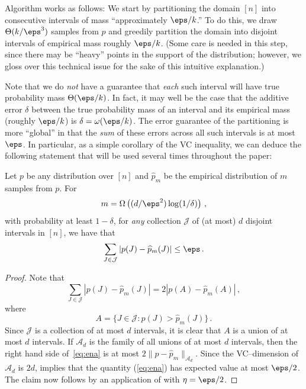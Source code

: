 %
%
Algorithm
\hyperref[alg:learn-kmodal-simple]{} works as follows: We start by partitioning
the domain $[n]$ into consecutive intervals of mass ``approximately $\eps/k$.''
To do this, {we draw $\Theta(k/\eps^3)$ samples from $p$ and greedily partition the domain  {into} disjoint intervals of 
empirical mass roughly $\eps/k$.} (Some care is needed in this step, since there may be ``heavy'' points in the support of the distribution;
however, we gloss over this technical issue for the sake of this intuitive explanation.)
{Note that we do \emph{not} have a guarantee that \emph{each} such interval will have true probability mass $\Theta(\eps/k)$. 
In fact, it may well be the case that the additive error $\delta$ between the true probability mass of an interval and its empirical mass
(roughly $\eps/k$) is $\delta = \omega(\eps/k)$.
The error guarantee of the partitioning is more ``global''  in that the \emph{sum} of these errors across all such intervals 
is at most $\eps$. In particular,  as a simple corollary of the VC inequality, we can deduce 
the following statement that will be used several times throughout the paper:

\begin{fact} \label{fact:vc}
Let $p$ be any distribution over $[n]$ and $\widehat{p}_m$ be the empirical distribution of $m$ samples from $p$.  
For 
\[
m = \Omega\left( (d/\eps^2) \log(1/\delta) \right)\,,
\]
with probability at least $1-\delta$, 
for \emph{any} collection $\mathcal{J}$ of (at most) $d$ disjoint intervals in $[n]$, we have that 
$$ \sum_{J \in \mathcal{J}} |p(J) - \widehat{p}_m(J)|  \le \eps\,.$$
\end{fact}

\begin{proof}
Note that 
\begin{equation} \label{eq:ena}
\sum_{J \in \mathcal{J}} |p(J) - \widehat{p}_m(J)|   = 2 |p(A) - \widehat{p}_m(A) |\,,
\end{equation}
where 
\[
A = \{J \in \mathcal{J} : p(J) >  \widehat{p}_m(J) \}\,.
\]
Since $\mathcal{J}$ is a collection of at most $d$ intervals, 
it is clear that $A$ is a union of at most $d$ intervals.
If $\mathcal{A}_d$ is the family of all unions of at most $d$ intervals, then the right hand side of~\eqref{eq:ena} is at most $2 \| p - \widehat{p}_m \|_{\mathcal{A}_d}$.
Since the VC--dimension of $\mathcal{A}_d$ is $2d$,  implies that the quantity (\ref{eq:ena}) has expected value at most  {$\eps/2$}.
The claim now follows by an application of  with  {$\eta = \eps/2$}.
\end{proof}}

